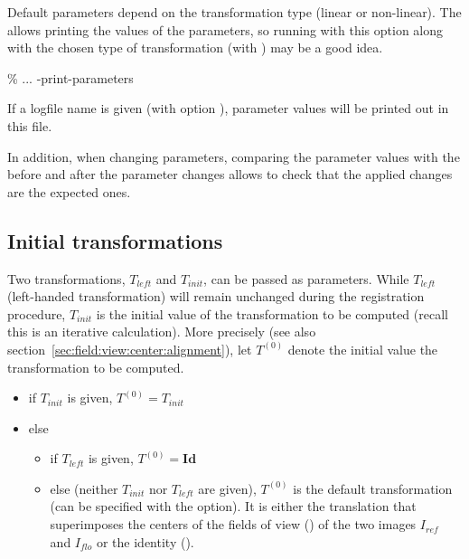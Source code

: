 \begin{attention} 
Default parameters depend on the transformation type (linear or non-linear). 
The  allows printing the values of the parameters, so running \blockmatching with this option along with the chosen type of transformation (with ) may be a good idea. 
\begin{code}{1}
\% \blockmatching ... -print-parameters
\end{code}
If a logfile name is given (with option ), parameter values will be printed out in this file.

In addition, when changing parameters, comparing the parameter values with the  before and after the parameter changes allows to check that the applied changes are the expected ones.
\end{attention}










\subsection{Initial transformations}
Two transformations, $T_{left}$ and $T_{init}$, can be passed
as parameters. While $T_{left}$ (left-handed transformation) will remain unchanged during the
registration procedure, $T_{init}$ is the initial value of the
transformation to be computed (recall this is an iterative
calculation). More precisely (see also section~\ref{sec:field:view:center:alignment}), let $T^{(0)}$ denote the initial value
the transformation to be computed.

\begin{itemize}
\item if $T_{init}$ is given, $T^{(0)} = T_{init}$ 
\item else 
\begin{itemize}
\item if $T_{left}$ is given, $T^{(0)}  = \mathbf{Id}$
\item else (neither $T_{init}$ nor $T_{left}$ are given), $T^{(0)}$ is the default transformation (can be specified with the  option). It is either the translation that superimposes the centers of the fields of view () of the two images $I_{ref}$ and
$I_{flo}$ or the identity ().
\end{itemize}
\end{itemize}

